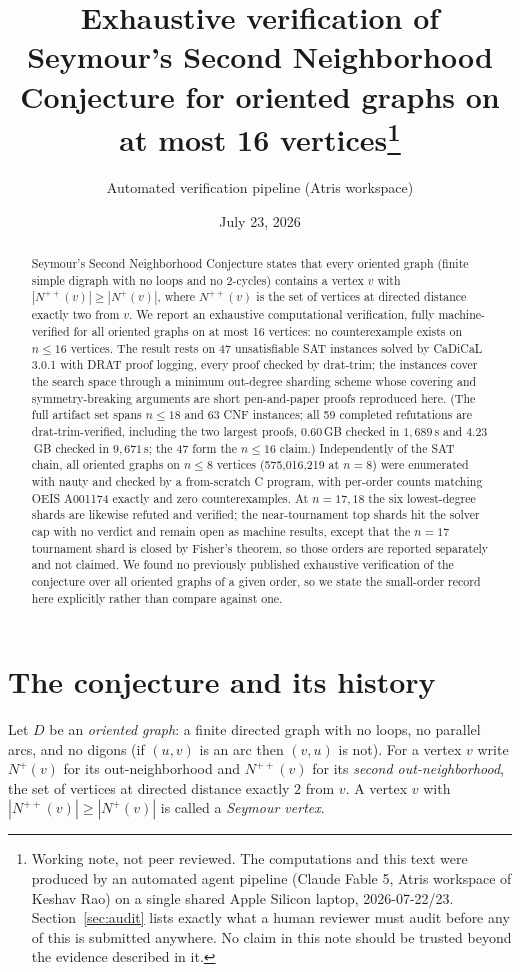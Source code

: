 \documentclass[11pt]{article}
\title{Exhaustive verification of Seymour's Second Neighborhood Conjecture
for oriented graphs on at most 16 vertices\thanks{Working note, not
peer reviewed. The computations and this text were produced by an automated
agent pipeline (Claude Fable 5, Atris workspace of Keshav Rao) on a single
shared Apple Silicon laptop, 2026-07-22/23. Section~\ref{sec:audit} lists
exactly what a human reviewer must audit before any of this is submitted
anywhere. No claim in this note should be trusted beyond the evidence
described in it.}}
\author{Automated verification pipeline (Atris workspace)}
\date{July 23, 2026}
\newcommand{\Nout}{N^{+}}
\newcommand{\Nsec}{N^{++}}
\begin{document}
\maketitle

\begin{abstract}
Seymour's Second Neighborhood Conjecture states that every oriented graph
(finite simple digraph with no loops and no 2-cycles) contains a vertex $v$
with $|\Nsec(v)| \ge |\Nout(v)|$, where $\Nsec(v)$ is the set of vertices at
directed distance exactly two from $v$. We report an exhaustive computational
verification, fully machine-verified for all oriented graphs on at most 16
vertices: no counterexample exists on $n \le 16$ vertices. The result
rests on 47 unsatisfiable SAT instances solved by CaDiCaL 3.0.1 with DRAT
proof logging, every proof checked by drat-trim; the instances cover the
search space through a minimum out-degree sharding scheme whose covering and
symmetry-breaking arguments are short pen-and-paper proofs reproduced here.
(The full artifact set spans $n \le 18$ and 63 CNF instances; all 59
completed refutations are drat-trim-verified, including the two largest
proofs, $0.60$\,GB checked in $1{,}689$\,s and $4.23$\,GB checked in
$9{,}671$\,s; the 47 form the $n \le 16$ claim.)
Independently of the SAT chain, all oriented graphs on $n \le 8$ vertices
(575{,}016{,}219 at $n=8$) were enumerated with nauty and checked by a
from-scratch C program, with per-order counts matching OEIS A001174 exactly
and zero counterexamples. At $n = 17, 18$ the six lowest-degree shards are
likewise refuted and verified; the near-tournament top shards hit the
solver cap with no verdict and remain open as machine results, except that
the $n = 17$ tournament shard is closed by Fisher's theorem, so those
orders are reported separately and not claimed. We found no previously published
exhaustive verification of the conjecture over all oriented graphs of a
given order, so we state the small-order record here explicitly rather than
compare against one.
\end{abstract}

\section{The conjecture and its history}\label{sec:intro}

Let $D$ be an \emph{oriented graph}: a finite directed graph with no loops,
no parallel arcs, and no digons (if $(u,v)$ is an arc then $(v,u)$ is not).
For a vertex $v$ write $\Nout(v)$ for its out-neighborhood and
$\Nsec(v)$ for its \emph{second out-neighborhood}, the set of vertices at
directed distance exactly $2$ from $v$. A vertex $v$ with
$|\Nsec(v)| \ge |\Nout(v)|$ is called a \emph{Seymour vertex}.
\end{document}
